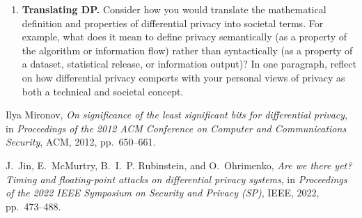 \documentclass[11pt]{article}
\begin{document}
\begin{enumerate}[leftmargin=*]
\item \textbf{Translating DP.}
 Consider how you would translate the mathematical definition and properties of differential privacy into societal terms. For example, what does it mean to define privacy semantically (as a property of the algorithm or information flow) rather than syntactically (as a property of a dataset, statistical release, or information output)? In one paragraph, reflect on how differential privacy comports with your personal views of privacy as both a technical and societal concept. 
 

\end{enumerate}
\begin{thebibliography}{99}
Ilya Mironov,
\textit{On significance of the least significant bits for differential privacy},
in \textit{Proceedings of the 2012 ACM Conference on Computer and Communications Security},
ACM, 2012, pp.~650--661.

J.~Jin, E.~McMurtry, B.~I.~P. Rubinstein, and O.~Ohrimenko,
\textit{Are we there yet? Timing and floating-point attacks on differential privacy systems},
in \textit{Proceedings of the 2022 IEEE Symposium on Security and Privacy (SP)},
IEEE, 2022, pp.~473--488.
\end{thebibliography}
\end{document}
